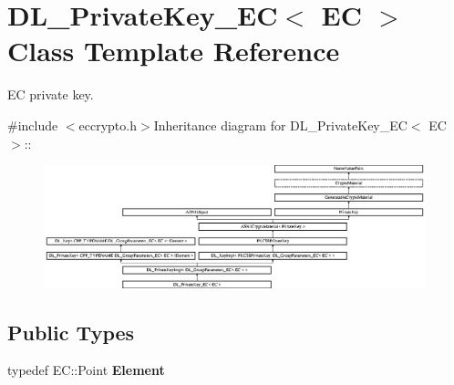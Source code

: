 \hypertarget{class_d_l___private_key___e_c}{
\section{DL\_\-PrivateKey\_\-EC$<$ EC $>$ Class Template Reference}
\label{class_d_l___private_key___e_c}
}


EC private key.  


{\ttfamily \#include $<$eccrypto.h$>$}Inheritance diagram for DL\_\-PrivateKey\_\-EC$<$ EC $>$::\begin{figure}[H]
\begin{center}
\leavevmode
\includegraphics[height=3.55932cm]{class_d_l___private_key___e_c}
\end{center}
\end{figure}
\subsection*{Public Types}
\begin{DoxyCompactItemize}
\item 
\hypertarget{class_d_l___private_key___e_c_a6529b6bc88cf2e528106f22930492dce}{
typedef EC::Point {\bfseries Element}}
\label{class_d_l___private_key___e_c_a6529b6bc88cf2e528106f22930492dce}

\end{DoxyCompactItemize}
